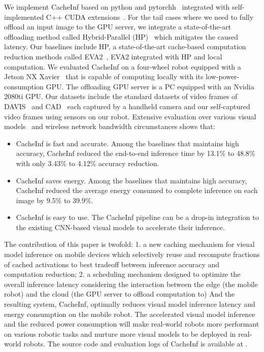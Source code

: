 We implement CacheInf based on python and pytorchh~\cite{paszke2017automatic} integrated with self-implemented C++ CUDA extensions~\cite{cuda}.
For the tail cases where we need to fully offload an input image to the GPU server, we integrate a state-of-the-art offloading method called Hybrid-Parallel (HP)~\cite{sun2024hybridparallel} which mitigates the caused latency.
Our baselines include HP, a state-of-the-art cache-based computation reduction methods called EVA2~\cite{buckler_eva_2018}, EVA2 integrated with HP and local computation.
We evaluated CacheInf on a four-wheel robot equipped with a Jetson NX Xavier~\cite{jetsonnx} that is capable of computing locally with its low-power-consumption GPU.
The offloading GPU server is a PC equipped with an Nvidia 2080ti GPU.
Our datasets include the standard datasets of video frames of DAVIS~\cite{Perazzi2016} and CAD~\cite{Choi_VSWS_2009} each captured by a handheld camera and our self-captured video frames using sensors on our robot.
Extensive evaluation over various visual models~\cite{kapao,agrnav,noauthor_torchvision_nodate} and wireless network bandwidth circumstances shows that:
\begin{itemize}
    \item CacheInf is fast and accurate. Among the baselines that maintains high accuracy, CacheInf reduced the end-to-end inference time by 13.1\% to 48.8\% with only 3.43\% to 4.12\% accuracy reduction.
    \item CacheInf saves energy. Among the baselines that maintains high accuracy, CacheInf reduced the average energy consumed to complete inference on each image by 9.5\% to 39.9\%.
    \item CacheInf is easy to use. The CacheInf pipeline can be a drop-in integration to the existing CNN-based visual models to accelerate their inference.
\end{itemize}

The contribution of this paper is twofold: 1. a new caching mechanism for visual model inference on mobile devices which selectively reuse and recompute fractions of cached activations to best tradeoff between inference accuracy and computation reduction; 2. a scheduling mechanism designed to optimize the overall inference latency considering the interaction between the edge (the mobile robot) and the cloud (the GPU server to offload computation to)
And the resulting system, CacheInf, optimally reduces visual model inference latency and energy consumption on the mobile robot.
The accelerated visual model inference and the reduced power consumption will make real-world robots more performant on various robotic tasks and nurture more visual models to be deployed in real-world robots.
The source code and evaluation logs of CacheInf is available at .


